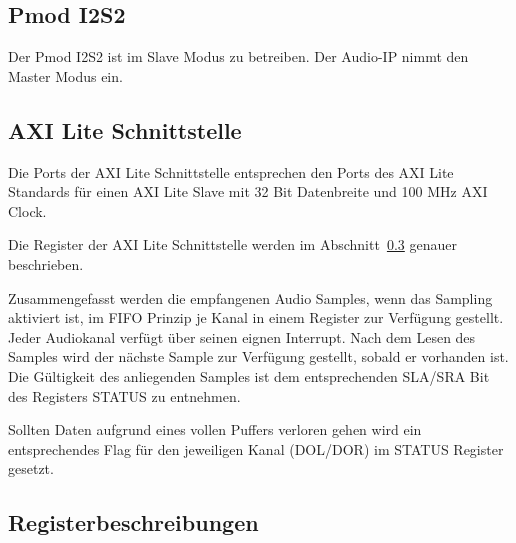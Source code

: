 \subsection{Pmod I2S2}

Der Pmod I2S2 ist im Slave Modus zu betreiben.
Der Audio-IP nimmt den Master Modus ein.

\subsection{AXI Lite Schnittstelle}

Die Ports der AXI Lite Schnittstelle entsprechen den Ports des AXI Lite Standards für einen AXI Lite Slave mit 32 Bit Datenbreite und 100 MHz AXI Clock.

Die Register der AXI Lite Schnittstelle werden im Abschnitt~\ref{subsec:audio_register} genauer beschrieben.

Zusammengefasst werden die empfangenen Audio Samples, wenn das Sampling aktiviert ist, im FIFO Prinzip je Kanal in einem Register zur Verfügung gestellt.
Jeder Audiokanal verfügt über seinen eignen Interrupt.
Nach dem Lesen des Samples wird der nächste Sample zur Verfügung gestellt, sobald er vorhanden ist.
Die Gültigkeit des anliegenden Samples ist dem entsprechenden SLA/SRA Bit des Registers STATUS zu entnehmen.

Sollten Daten aufgrund eines vollen Puffers verloren gehen wird ein entsprechendes Flag für den jeweiligen Kanal (DOL/DOR) im STATUS Register gesetzt.

\subsection{Registerbeschreibungen}\label{subsec:audio_register}

